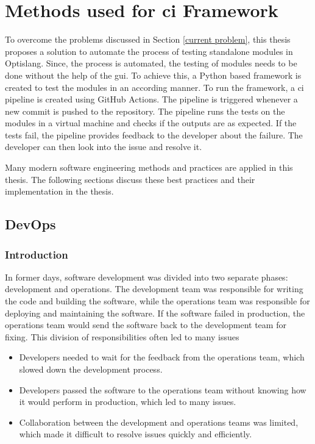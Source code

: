 \chapter{Methods used for \acrshort{ci} Framework}
To overcome the problems discussed in Section \ref{current problem}, this thesis proposes a solution to automate the process of testing standalone modules
in Optislang. Since, the process is automated, the testing of modules needs to be done without the help of the \acrshort{gui}. To achieve this, a Python based 
framework is created to test the modules in an according manner. To run the framework, a \acrshort{ci} pipeline is created using GitHub Actions. The pipeline 
is triggered whenever a new commit is pushed to the repository. The pipeline runs the tests on the modules in a virtual machine and checks if the outputs are as expected. If the tests 
fail, the pipeline provides feedback to the developer about the failure. The developer can then look into the issue and resolve it. 

Many modern software engineering methods and practices are applied in this thesis. The following sections discuss these best practices and their implementation in the thesis. 
\section{DevOps}
\subsection{Introduction}
In former days, software development was divided into two separate phases: development and operations. The development team was responsible for writing the code and 
building the software, while the operations team was responsible for deploying and maintaining the software. If the software failed in production, the operations 
team would send the software back to the development team for fixing. This division of responsibilities often led to many issues
\begin{itemize}
    \item Developers needed to wait for the feedback from the operations team, which slowed down the development process.
    \item Developers passed the software to the operations team without knowing how it would perform in production, which led to many issues.
    \item Collaboration between the development and operations teams was limited, which made it difficult to resolve issues quickly and efficiently.
\end{itemize}

